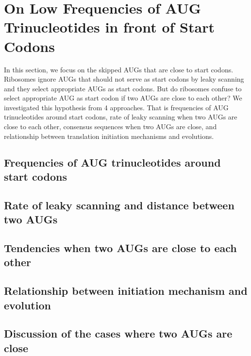 

\section{On Low Frequencies of AUG Trinucleotides in front of Start Codons}
\label{lowfreq}

In this section, we focus on the skipped AUGs that are close to start
codons.
Ribosomes ignore AUGs that should not serve as start codons by leaky 
scanning and they select appropriate AUGs as start codons. But do
ribosomes confuse to select appropriate AUG as start codon if two AUGs
are close to each other? 
 We investigated this hypothesis from
4 approaches. That is frequencies of AUG trinucleotides around start codons,
rate of leaky scanning when two AUGs are close to each other,
consensus sequences when two AUGs are close, and relationship between
translation initiation mechanisms and evolutions.


\subsection{Frequencies of AUG trinucleotides around start codons}
 


\subsection{Rate of leaky scanning and distance between two AUGs}



\subsection{Tendencies when two AUGs are close to each other}




\subsection{Relationship between initiation mechanism and evolution}



\subsection{Discussion of the cases where two AUGs are close}

